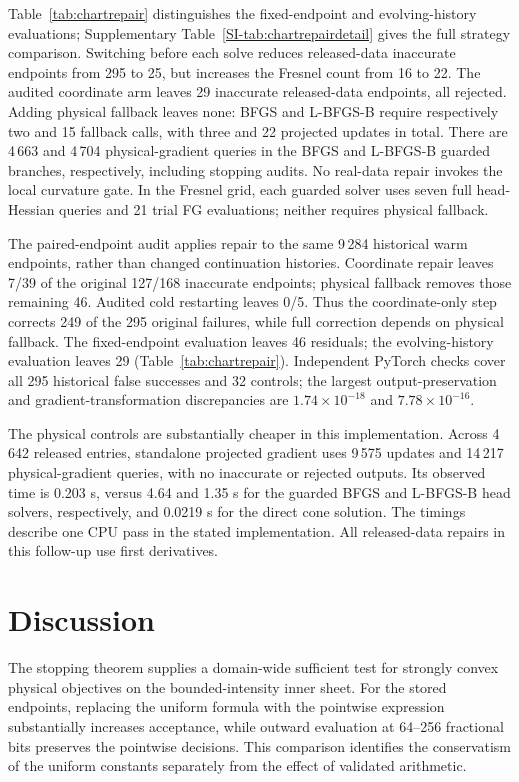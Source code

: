 \documentclass[pdflatex,sn-mathphys-num]{sn-jnl}
\begin{document}
Table~\ref{tab:chartrepair} distinguishes the fixed-endpoint and evolving-history evaluations; Supplementary Table~\ref{SI-tab:chartrepairdetail} gives the full strategy comparison. Switching before each solve reduces released-data inaccurate endpoints from 295 to 25, but increases the Fresnel count from 16 to 22. The audited coordinate arm leaves 29 inaccurate released-data endpoints, all rejected. Adding physical fallback leaves none: BFGS and L-BFGS-B require respectively two and 15 fallback calls, with three and 22 projected updates in total. There are 4\,663 and 4\,704 physical-gradient queries in the BFGS and L-BFGS-B guarded branches, respectively, including stopping audits. No real-data repair invokes the local curvature gate. In the Fresnel grid, each guarded solver uses seven full head-Hessian queries and 21 trial FG evaluations; neither requires physical fallback.

The paired-endpoint audit applies repair to the same 9\,284 historical warm endpoints, rather than changed continuation histories. Coordinate repair leaves 7/39 of the original 127/168 inaccurate endpoints; physical fallback removes those remaining 46. Audited cold restarting leaves 0/5. Thus the coordinate-only step corrects 249 of the 295 original failures, while full correction depends on physical fallback. The fixed-endpoint evaluation leaves 46 residuals; the evolving-history evaluation leaves 29 (Table~\ref{tab:chartrepair}). Independent PyTorch checks cover all 295 historical false successes and 32 controls; the largest output-preservation and gradient-transformation discrepancies are $1.74\times10^{-18}$ and $7.78\times10^{-16}$.

The physical controls are substantially cheaper in this implementation. Across 4\,642 released entries, standalone projected gradient uses 9\,575 updates and 14\,217 physical-gradient queries, with no inaccurate or rejected outputs. Its observed time is 0.203 s, versus 4.64 and 1.35 s for the guarded BFGS and L-BFGS-B head solvers, respectively, and 0.0219 s for the direct cone solution. The timings describe one CPU pass in the stated implementation. All released-data repairs in this follow-up use first derivatives.







\section{Discussion}
The stopping theorem supplies a domain-wide sufficient test for strongly convex physical objectives on the bounded-intensity inner sheet. For the stored endpoints, replacing the uniform formula with the pointwise expression substantially increases acceptance, while outward evaluation at 64--256 fractional bits preserves the pointwise decisions. This comparison identifies the conservatism of the uniform constants separately from the effect of validated arithmetic.
\end{document}
